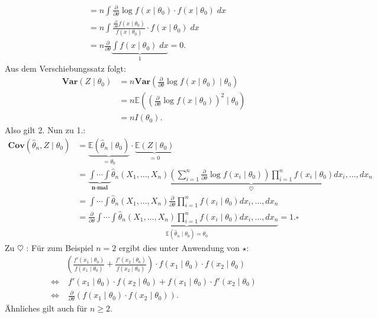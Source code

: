 \documentclass[10pt]{article}
\newcommand{\FZV}{X_1, \ldots, X_n} %
\newcommand{\EW}{\mathbb{E}} %
\newcommand{\ablt}{\frac{\partial}{\partial \theta}}
\newenvironment{BWS}[1][]
{\begin{Beweis}[frametitle=#1]}{\end{Beweis}}
\begin{document}
\begin{BWS}[Beweis 1.4.1 (Cramér-Rao-Schranke)]
\begin{equation*}
\begin{split}
				&= n \int \ablt \log f(x \mid \theta_0) \cdot f(x \mid \theta_0) \; dx\\
				&= n \int \frac{\ablt f(x \mid \theta_0)}{f(x \mid \theta_0)} \cdot f(x \mid \theta_0) \; dx\\
				&= n \ablt \underbrace{\int f(x \mid \theta_0) \; dx}_{1} = 0.
			\end{split}
		\end{equation*}
		Aus dem Verschiebungssatz folgt:
		\begin{equation*}
			\begin{split}
				\textbf{Var}(Z \mid \theta_0) &= n \textbf{Var}\left(\ablt \log f(x \mid \theta_0)\mid \theta_0 \right)\\
				&= n\EW\left(\left(\ablt \log f(x \mid \theta_0)\right)^2 \mid \theta_0\right)\\
				&= nI(\theta_0).
			\end{split}
		\end{equation*}
		Also gilt 2. Nun zu 1.:
		\begin{equation*}
			\begin{split}
				\textbf{Cov}(\hat{\theta}_n, Z \mid \theta_0) &= \underbrace{\EW(\hat{\theta}_n \mid \theta_0)}_{= \theta_0} \cdot \underbrace{\EW(Z \mid \theta_0)}_{= 0}\\
				&= \underbrace{\int \cdots \int}_{\textbf{n-mal}}\hat{\theta}_n(\FZV) \underbrace{(\sum_{i=1}^{n}\ablt \log f(x_i \mid \theta_0)) \prod_{i=1}^{n}f(x_i \mid \theta_0)}_{\heartsuit} dx_i, \ldots, dx_n\\
				&= \int \cdots \int \hat{\theta}_n (\FZV) \ablt \prod_{i=1}^{n} f(x_i \mid \theta_0) dx_i, \ldots, dx_n\\
				&= \ablt \underbrace{\int \cdots \int \hat{\theta}_n(\FZV) \prod_{i=1}^{n} f(x_i \mid \theta_0) dx_i, \ldots, dx_n}_{\EW(\hat{\theta}_n \mid \theta_0) = \theta_0} = 1. \square
			\end{split}
		\end{equation*}
		Zu $\heartsuit$ : Für zum Beispiel $n=2$ ergibt dies unter Anwendung von $\star$:
		\begin{equation*}
			\begin{split}
				&\left(\frac{f'(x_1 \mid \theta_0)}{f(x_1 \mid \theta_0)} + \frac{f'(x_2 \mid \theta_0)}{f(x_2 \mid \theta_0)}\right) \cdot f(x_1 \mid \theta_0) \cdot f(x_2 \mid \theta_0)\\
				\Leftrightarrow & \;f'(x_1 \mid \theta_0) \cdot f(x_2 \mid \theta_0) + f(x_1 \mid \theta_0) \cdot f'(x_2 \mid \theta_0)\\
				\Leftrightarrow & \;\ablt (f(x_1 \mid \theta_0) \cdot f(x_2 \mid \theta_0)).
			\end{split}
		\end{equation*}
		Ähnliches gilt auch für $n \geq 2$.
	\end{BWS}
	
\end{document}

